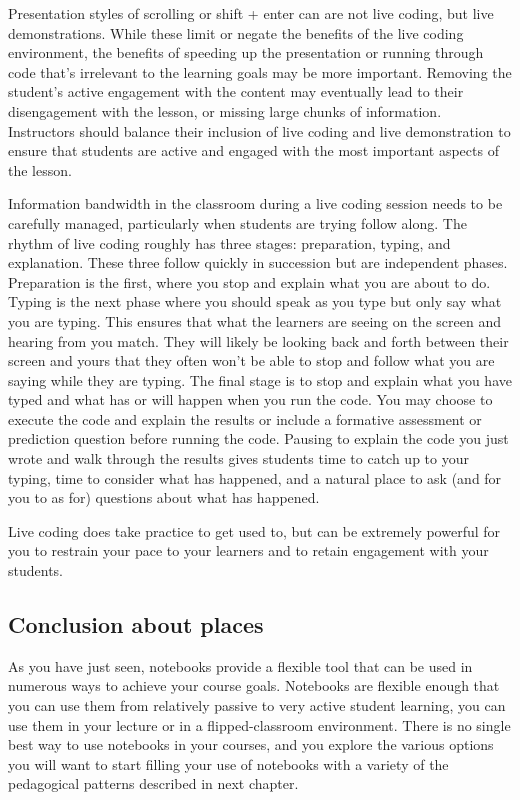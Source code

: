 \documentclass[]{book}
\begin{document}
Presentation styles of scrolling or shift + enter can are not live
coding, but live demonstrations. While these limit or negate the
benefits of the live coding environment, the benefits of speeding up the
presentation or running through code that's irrelevant to the learning
goals may be more important. Removing the student's active engagement
with the content may eventually lead to their disengagement with the
lesson, or missing large chunks of information. Instructors should
balance their inclusion of live coding and live demonstration to ensure
that students are active and engaged with the most important aspects of
the lesson.

Information bandwidth in the classroom during a live coding session
needs to be carefully managed, particularly when students are trying
follow along. The rhythm of live coding roughly has three stages:
preparation, typing, and explanation. These three follow quickly in
succession but are independent phases. Preparation is the first, where
you stop and explain what you are about to do. Typing is the next phase
where you should speak as you type but only say what you are typing.
This ensures that what the learners are seeing on the screen and hearing
from you match. They will likely be looking back and forth between their
screen and yours that they often won't be able to stop and follow what
you are saying while they are typing. The final stage is to stop and
explain what you have typed and what has or will happen when you run the
code. You may choose to execute the code and explain the results or
include a formative assessment or prediction question before running the
code. Pausing to explain the code you just wrote and walk through the
results gives students time to catch up to your typing, time to consider
what has happened, and a natural place to ask (and for you to as for)
questions about what has happened.

Live coding does take practice to get used to, but can be extremely
powerful for you to restrain your pace to your learners and to retain
engagement with your students.

\subsection{Conclusion about places}\label{conclusion-about-places}

As you have just seen, notebooks provide a flexible tool that can be
used in numerous ways to achieve your course goals. Notebooks are
flexible enough that you can use them from relatively passive to very
active student learning, you can use them in your lecture or in a
flipped-classroom environment. There is no single best way to use
notebooks in your courses, and you explore the various options you will
want to start filling your use of notebooks with a variety of the
pedagogical patterns described in next chapter.
\end{document}
